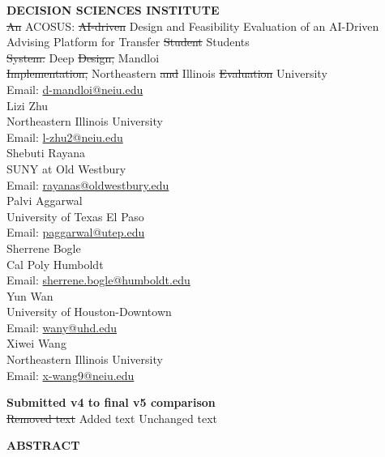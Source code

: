 \documentclass[letterpaper,11pt]{article}
\newcommand{\DIFdel}[1]{%
  \begingroup\setlength{\fboxsep}{0.5pt}%
  \colorbox{diffdelbg}{\textcolor{diffdeltext}{\sout{#1}}}%
  \endgroup}
\newcommand{\DIFadd}[1]{%
  \begingroup\setlength{\fboxsep}{0.5pt}%
  \colorbox{diffaddbg}{\textcolor{diffaddtext}{#1}}%
  \endgroup}
\newcommand{\DIFlegend}{%
  \begin{center}\small
  \textbf{Submitted v4 to final v5 comparison}\\[4pt]
  \DIFdel{Removed text}\quad\DIFadd{Added text}\quad Unchanged text
  \end{center}\medskip}
\begin{document}
\begin{center}
\textbf{DECISION SCIENCES INSTITUTE}\\[6pt]
\DIFdel{An} \DIFadd{ACOSUS:} \DIFdel{AI-driven} \DIFadd{Design} \DIFadd{and} \DIFadd{Feasibility} \DIFadd{Evaluation} \DIFadd{of} \DIFadd{an} \DIFadd{AI-Driven} \DIFadd{Advising} \DIFadd{Platform} \DIFadd{for} Transfer \DIFdel{Student} \DIFadd{Students}
\\[12pt]
\DIFdel{System:} \DIFadd{Deep} \DIFdel{Design,} \DIFadd{Mandloi}\\
\DIFdel{Implementation,} \DIFadd{Northeastern} \DIFdel{and} \DIFadd{Illinois} \DIFdel{Evaluation} \DIFadd{University}\\
Email: \href{mailto:d-mandloi@neiu.edu}{d-mandloi@neiu.edu}\\[6pt]
Lizi Zhu\\
Northeastern Illinois University\\
Email: \href{mailto:l-zhu2@neiu.edu}{l-zhu2@neiu.edu}\\[6pt]
Shebuti Rayana\\
SUNY at Old Westbury\\
Email: \href{mailto:rayanas@oldwestbury.edu}{rayanas@oldwestbury.edu}\\[6pt]
Palvi Aggarwal\\
University of Texas El Paso\\
Email: \href{mailto:paggarwal@utep.edu}{paggarwal@utep.edu}\\[6pt]
Sherrene Bogle\\
Cal Poly Humboldt\\
Email: \href{mailto:sherrene.bogle@humboldt.edu}{sherrene.bogle@humboldt.edu}\\[6pt]
Yun Wan\\
University of Houston-Downtown\\
Email: \href{mailto:wany@uhd.edu}{wany@uhd.edu}\\[6pt]
Xiwei Wang\\
Northeastern Illinois University\\
Email: \href{mailto:x-wang9@neiu.edu}{x-wang9@neiu.edu}
\end{center}
\DIFlegend

\bigskip

\begin{center}
\textbf{ABSTRACT}
\end{center}
\end{document}

